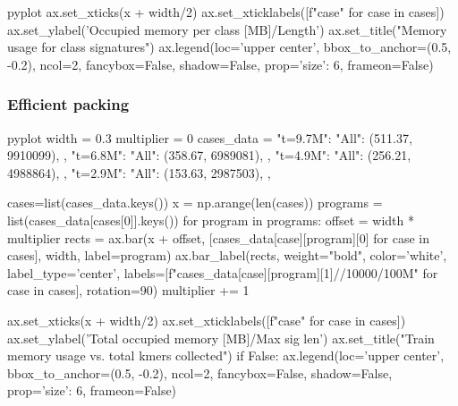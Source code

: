 \begin{frame}[fragile]
\begin{CacheMeCode}{pyplot}
    ax.set_xticks(x + width/2)
    ax.set_xticklabels([f"{case}" for case in cases])
    ax.set_ylabel('Occupied memory per class [MB]/Length')
    ax.set_title("Memory usage for class signatures")
    ax.legend(loc='upper center', bbox_to_anchor=(0.5, -0.2),
        ncol=2, fancybox=False, shadow=False, prop={'size': 6}, frameon=False)
  \end{CacheMeCode}
\end{frame}


\begin{frame}[fragile]
  \frametitle{Efficient packing}

  \begin{CacheMeCode}{pyplot}
    width = 0.3
    multiplier = 0
    cases_data = {
      "t=9.7M": {
        "All": (511.37, 9910099),
      },
      "t=6.8M": {                                                                                                                                                                                                                               
        "All": (358.67, 6989081),                                                                                                                                                                                                         
      },
      "t=4.9M": {
        "All": (256.21, 4988864),
      },
      "t=2.9M": {
        "All": (153.63, 2987503),
      },
    }

    cases=list(cases_data.keys())
    x = np.arange(len(cases))
    programs = list(cases_data[cases[0]].keys())
    for program in programs:
      offset = width * multiplier
      rects = ax.bar(x + offset, [cases_data[case][program][0] for case in cases], width, label=program)
      ax.bar_label(rects, weight="bold", color='white', label_type='center', labels=[f"{cases_data[case][program][1]//10000/100}M" for case in cases], rotation=90)
      multiplier += 1

    ax.set_xticks(x + width/2)
    ax.set_xticklabels([f"{case}" for case in cases])
    ax.set_ylabel('Total occupied memory [MB]/Max sig len')
    ax.set_title("Train memory usage vs. total kmers collected")
    if False:
      ax.legend(loc='upper center', bbox_to_anchor=(0.5, -0.2),
          ncol=2, fancybox=False, shadow=False, prop={'size': 6}, frameon=False)
  \end{CacheMeCode}
\end{frame}

